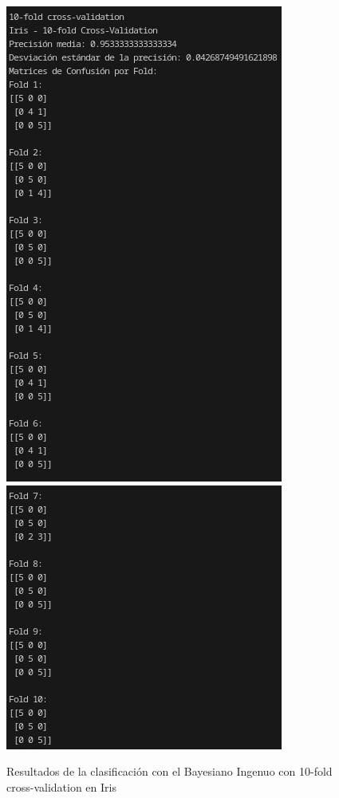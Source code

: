 \documentclass{article}
\begin{document}
    \begin{figure}[!h]
        \centering
        \includegraphics[scale=0.45]{10-fold-iris-1.jpg}
        \includegraphics[scale=0.6]{10-fold-iris-2.jpg}
        \caption{Resultados de la clasificación con el Bayesiano Ingenuo con 10-fold cross-validation en Iris}
    \end{figure}
\end{document}
